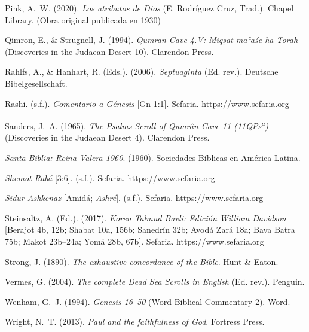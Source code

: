 \documentclass[11pt,letterpaper]{article}
\newcommand{\refapa}[1]{\par{\RaggedRight\hangindent=1.27cm\hangafter=1\noindent #1\par}\vspace{4pt}}
\begin{document}
\refapa{Pink, A.~W. (2020). \emph{Los atributos de Dios} (E. Rodríguez Cruz, Trad.). Chapel Library. (Obra original publicada en 1930)}
\refapa{Qimron, E., \& Strugnell, J. (1994). \emph{Qumran Cave 4.V: Miqṣat maʿaśe ha-Torah} (Discoveries in the Judaean Desert 10). Clarendon Press.}
\refapa{Rahlfs, A., \& Hanhart, R. (Eds.). (2006). \emph{Septuaginta} (Ed. rev.). Deutsche Bibelgesellschaft.}
\refapa{Rashi. (s.f.). \emph{Comentario a Génesis} [Gn 1:1]. Sefaria. https://www.sefaria.org}
\refapa{Sanders, J.~A. (1965). \emph{The Psalms Scroll of Qumrân Cave 11 (11QPs\textsuperscript{a})} (Discoveries in the Judaean Desert 4). Clarendon Press.}
\refapa{\emph{Santa Biblia: Reina-Valera 1960}. (1960). Sociedades Bíblicas en América Latina.}
\refapa{\emph{Shemot Rabá} [3:6]. (s.f.). Sefaria. https://www.sefaria.org}
\refapa{\emph{Sidur Ashkenaz} [Amidá; \emph{Ashré}]. (s.f.). Sefaria. https://www.sefaria.org}
\refapa{Steinsaltz, A. (Ed.). (2017). \emph{Koren Talmud Bavli: Edición William Davidson} [Berajot 4b, 12b; Shabat 10a, 156b; Sanedrín 32b; Avodá Zará 18a; Bava Batra 75b; Makot 23b--24a; Yomá 28b, 67b]. Sefaria. https://www.sefaria.org}
\refapa{Strong, J. (1890). \emph{The exhaustive concordance of the Bible}. Hunt \& Eaton.}
\refapa{Vermes, G. (2004). \emph{The complete Dead Sea Scrolls in English} (Ed. rev.). Penguin.}
\refapa{Wenham, G.~J. (1994). \emph{Genesis 16--50} (Word Biblical Commentary 2). Word.}
\refapa{Wright, N.~T. (2013). \emph{Paul and the faithfulness of God}. Fortress Press.}
\end{document}
